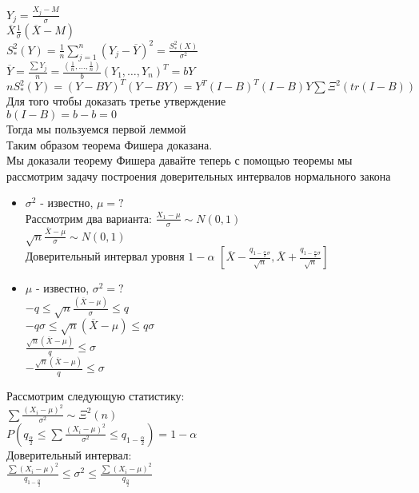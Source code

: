 \documentclass{article}
\newcommand\0{\mathbb{0}}
\newcommand\1{\mathbb{1}}
\begin{document}
$Y_j = \frac{X_j - M}{\sigma}$\\
$\overline{X} \frac{1}{\sigma}(\overline{X} - M)$\\
$S_*^2(Y) = \frac{1}{n} \displaystyle\sum_{j = 1}^n (Y_j - \overline{Y})^2 = \frac{S_*^2(X)}{\sigma^2}$\\
$\overline{Y} = \frac{\sum Y_j}{n} = \frac{(\frac{1}{n}, \dots, \frac{1}{n})}{b} (Y_1, \dots, Y_n)^T = bY$\\
$nS_*^2(Y) = (Y - BY)^T(Y - BY) = Y^T(I - B)^T(I - B)Y \sum \Xi^2(tr(I - B))$\\
Для того чтобы доказать третье утверждение\\
$b(I - B) = b - b = 0$\\
Тогда мы пользуемся первой леммой\\
Таким образом теорема Фишера доказана.\\
Мы доказали теорему Фишера давайте теперь с помощью теоремы мы рассмотрим задачу построения доверительных интервалов нормального закона\\
\begin{itemize}
    \item $\sigma^2$ - известно, $\mu = ?$\\
    Рассмотрим два варианта: $\frac{X_1 - \mu}{\sigma} \sim N(0, 1)$\\
    $\sqrt{n}\frac{\overline{X} - \mu}{\sigma} \sim N(0, 1)$\\
    Доверительный интервал уровня $1 - \alpha$ $[\overline{X} - \frac{q_{1 - \frac{\alpha}{2}\sigma}}{\sqrt{n}}, \overline{X} + \frac{q_{1 - \frac{\alpha}{2}\sigma}}{\sqrt{n}}]$
    \item $\mu$ - известно, $\sigma^2 = ?$\\
    $-q \leq \sqrt{n}\frac{(\overline{X} - \mu)}{\sigma} \leq q$\\
    $-q\sigma \leq \sqrt{n}(\overline{X} - \mu) \leq q\sigma$\\
    $\frac{\sqrt{n}(\overline{X} - \mu)}{q} \leq \sigma$\\
    $-\frac{\sqrt{n}(\overline{X} - \mu)}{q} \leq \sigma$
\end{itemize}
Рассмотрим следующую статистику:\\
$\displaystyle\sum \frac{(X_i - \mu)^2}{\sigma^2} \sim \Xi^2(n)$\\
$P(q_{\frac{\alpha}{2}} \leq \displaystyle\sum \frac{(X_i - \mu)^2}{\sigma^2} \leq q_{1 - \frac{\alpha}{2}}) = 1 - \alpha$\\
Доверительный интервал:\\
$\frac{\displaystyle\sum (X_i - \mu)^2}{q_{1 - \frac{\alpha}{2}}} \leq  \sigma^2 \leq \frac{\displaystyle\sum(X_i - \mu)^2}{q_{\frac{\alpha}{2}}}$\\
\end{document}
